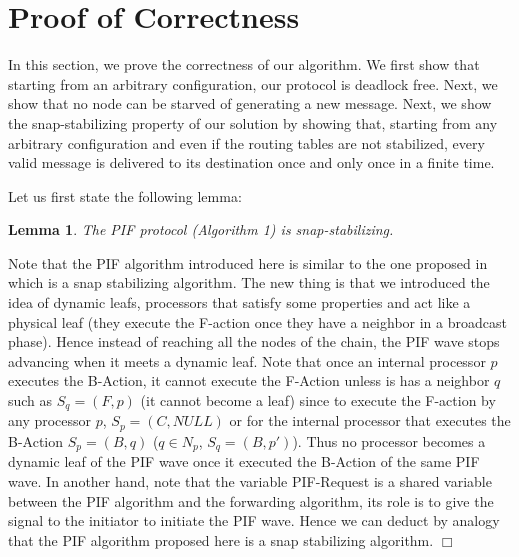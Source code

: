\documentclass{llncs}
\renewenvironment{proof}{{\it Proof. } }{{\hfill $\Box$}\vspace{.5pc}}
\newtheorem{lem}{Lemma}
\begin{document}
\begin{algorithm}[htb]
\begin{scriptsize}
\begin{itemize}
  \end{itemize}
  \end{scriptsize}
  \end{algorithm}
  







\section{Proof of Correctness\label{sec:proof}}

In this section, we prove the correctness of our algorithm.
We first show that starting from an arbitrary configuration, our protocol is deadlock free.  Next, we show that no node
can be starved of generating a new message. Next, we show the snap-stabilizing property of our solution by showing that,
starting from any arbitrary configuration and even if the routing tables are not stabilized, every valid message is 
delivered to its destination once and only once in a finite time.  

Let us first state the following lemma:

\begin{lem}\label{PIF}
The PIF protocol (Algorithm 1) is snap-stabilizing.
\end{lem}  



\begin{proof}
Note that the PIF algorithm introduced here is similar to the one proposed in \cite{Bui07} which is a snap stabilizing algorithm. The new thing is that we introduced the idea of dynamic leafs, processors that satisfy some properties and act like a physical leaf (they execute the F-action once they have a neighbor in a broadcast phase). Hence instead of reaching all the nodes of the chain, the PIF wave stops advancing when it meets a dynamic leaf. Note that once an internal processor $p$ executes the B-Action, it cannot execute the F-Action unless is has a neighbor $q$ such as $S_{q}=(F,p)$ (it cannot become a leaf) since to execute the F-action by any processor $p$, $S_{p}=(C,NULL)$ or for the internal processor that executes the B-Action $S_{p}=(B,q)$ ($q \in N_{p}$, $S_{q}=(B,p')$). Thus no processor becomes a dynamic leaf of the PIF wave once it executed the B-Action of the same PIF wave.
In another hand, note that the variable PIF-Request is a shared variable between the PIF algorithm and the forwarding algorithm, its role is to give the signal to the initiator to initiate the PIF wave. Hence we can deduct by analogy that the PIF algorithm proposed here is a snap stabilizing algorithm.
\end{proof}
\end{document}
